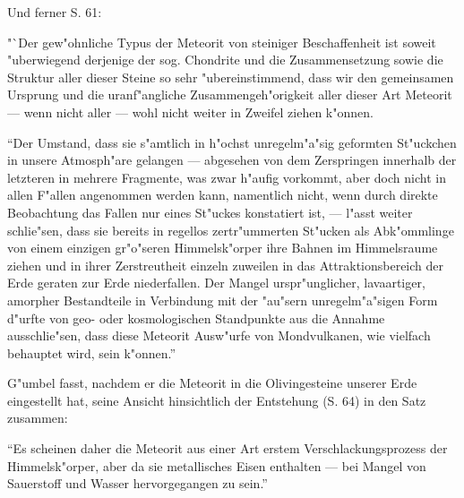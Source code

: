 \documentclass[a4paper, 11pt, oneside]{article}
\begin{document}
Und ferner S. 61:

"`Der gew"ohnliche Typus der Meteorit von steiniger Beschaffenheit ist soweit "uberwiegend derjenige der sog. Chondrite und die Zusammensetzung sowie die Struktur aller dieser Steine so sehr "ubereinstimmend, dass wir den gemeinsamen Ursprung und die uranf"angliche Zusammengeh"origkeit aller dieser Art Meteorit --- wenn nicht aller --- wohl nicht weiter in Zweifel ziehen k"onnen.

"`Der Umstand, dass sie s"amtlich in h"ochst unregelm"a"sig geformten St"uckchen in unsere Atmosph"are gelangen --- abgesehen von dem Zerspringen innerhalb der letzteren in mehrere Fragmente, was zwar h"aufig vorkommt, aber doch nicht in allen F"allen angenommen werden kann, namentlich nicht, wenn durch direkte Beobachtung das Fallen nur eines St"uckes konstatiert ist, --- l"asst weiter schlie"sen, dass sie bereits in regellos zertr"ummerten St"ucken als Abk"ommlinge von einem einzigen gr"o"seren Himmelsk"orper ihre Bahnen im Himmelsraume ziehen und in ihrer Zerstreutheit einzeln zuweilen in das Attraktionsbereich der Erde geraten zur Erde niederfallen. Der Mangel urspr"unglicher, lavaartiger, amorpher Bestandteile in Verbindung mit der "au"sern unregelm"a"sigen Form d"urfte von geo- oder kosmologischen Standpunkte aus die Annahme ausschlie"sen, dass diese Meteorit Ausw"urfe von Mondvulkanen, wie vielfach behauptet wird, sein k"onnen."'

G"umbel fasst, nachdem er die Meteorit in die Olivingesteine unserer Erde eingestellt hat, seine Ansicht hinsichtlich der Entstehung (S. 64) in den Satz zusammen:

"`Es scheinen daher die Meteorit aus einer Art erstem Verschlackungsprozess der Himmelsk"orper, aber da sie metallisches Eisen enthalten --- bei Mangel von Sauerstoff und Wasser hervorgegangen zu sein."'
\end{document}
